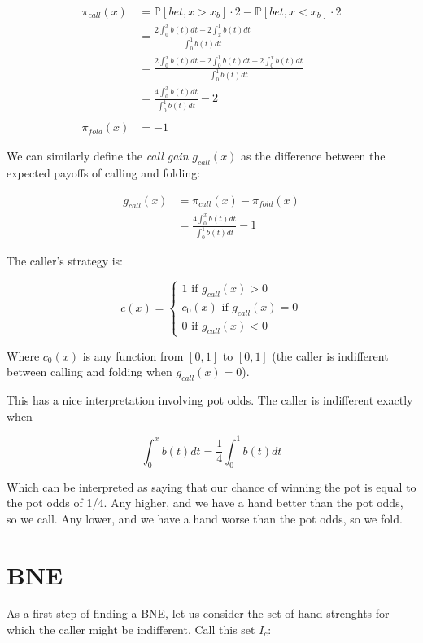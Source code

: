 \documentclass[a4paper,12pt]{article}
\begin{document}
\begin{align*}
    \pi_{call}(x) & = \mathbb{P}[bet, x>x_b] \cdot 2 - \mathbb{P}[bet, x<x_b] \cdot 2\\
    & = \frac{2 \int_{0}^{x} b(t) dt - 2 \int_{x}^{1} b(t) dt}{\int_{0}^{1} b(t)dt} \\
    & = \frac{2 \int_{0}^{x} b(t) dt - 2\int_{0}^{1} b(t) dt + 2\int_{0}^{x} b(t) dt}{\int_{0}^{1} b(t)dt} \\
    & = \frac{4 \int_{0}^{x} b(t) dt}{\int_{0}^{1} b(t)dt}  - 2 \\
    & \\
    \pi_{fold}(x) & = -1
\end{align*}

We can similarly define the \textit{call gain} $g_{call}(x)$ as the difference between the expected payoffs of calling and folding:

\begin{align*}
    g_{call}(x) &= \pi_{call}(x) - \pi_{fold}(x) \\
    & = \frac{4 \int_{0}^{x} b(t) dt}{\int_{0}^{1} b(t)dt}  - 1
\end{align*}

The caller's strategy is:

\[
    c(x) = \begin{cases}
        1 \text{ if } g_{call}(x) > 0 \\
        c_0(x) \text{ if } g_{call}(x) = 0 \\
        0 \text{ if } g_{call}(x) < 0
    \end{cases}
\]

Where $c_0(x)$ is any function from $[0, 1]$ to $[0, 1]$ (the caller is indifferent between calling and folding when $g_{call}(x)=0$).

This has a nice interpretation involving pot odds. The caller is indifferent exactly when

\[ \int_{0}^{x} b(t) dt = \frac{1}{4} \int_{0}^{1} b(t)dt \]

Which can be interpreted as saying that our chance of winning the pot is equal to the pot odds of 1/4. Any higher, and we have a hand better than the pot odds, so we call. Any lower, and we have a hand worse than the pot odds, so we fold. 

\section{BNE}

As a first step of finding a BNE, let us consider the set of hand strenghts for which the caller might be indifferent. Call this set $I_c$:
\end{document}
